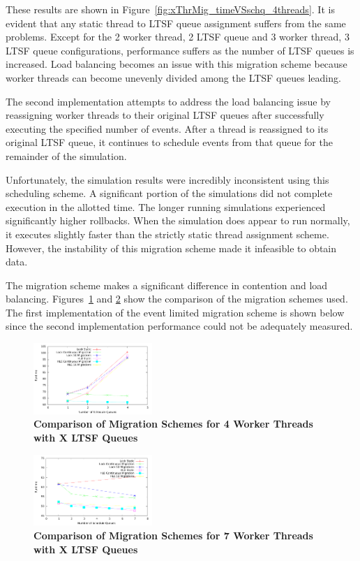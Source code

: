 \documentclass{sig-alternate}
\begin{document}
These results are shown in Figure~\ref{fig:xThrMig_timeVSschq_4threads}.  It is evident
that any static thread to LTSF queue assignment suffers from the same problems.  Except
for the 2 worker thread, 2 LTSF queue and 3 worker thread, 3 LTSF queue configurations,
performance suffers as the number of LTSF queues is increased.  Load balancing becomes an
issue with this migration scheme because worker threads can become unevenly divided among
the LTSF queues leading.

The second implementation attempts to address the load balancing issue by reassigning
worker threads to their original LTSF queues after successfully executing the specified
number of events.  After a thread is reassigned to its original LTSF queue, it continues
to schedule events from that queue for the remainder of the simulation.

Unfortunately, the simulation results were incredibly inconsistent using this scheduling
scheme.  A significant portion of the simulations did not complete execution in the
allotted time.  The longer running simulations experienced significantly higher rollbacks.
When the simulation does appear to run normally, it executes slightly faster than the
strictly static thread assignment scheme.  However, the instability of this migration
scheme made it infeasible to obtain data.

The migration scheme makes a significant difference in contention and load
balancing.  Figures~\ref{fig:migComp_4threads} and
\ref{fig:migComp_7threads} show the comparison of the migration schemes used.
The first implementation of the event limited migration scheme is shown below
since the second implementation performance could not be adequately measured.

\begin{figure}
    \centering
    \graphicspath{ {./figures/} }
    \includegraphics[width=0.4\textwidth,keepaspectratio]{migComp_4threads}
    \caption{\textbf{Comparison of Migration Schemes for 4 Worker Threads with X LTSF
        Queues}}\label{fig:migComp_4threads}
\end{figure}

\begin{figure}
    \centering
    \graphicspath{ {./figures/} }
    \includegraphics[width=0.4\textwidth,keepaspectratio]{migComp_7threads}
    \caption{\textbf{Comparison of Migration Schemes for 7 Worker Threads with X LTSF
        Queues}}\label{fig:migComp_7threads}
\end{figure}
\end{document}
